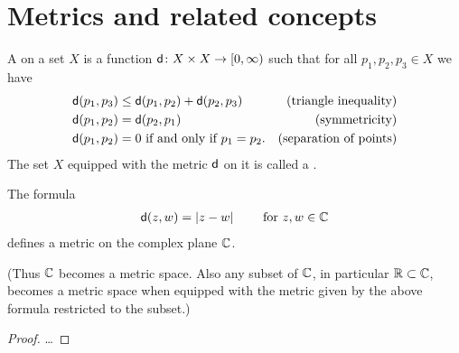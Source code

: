 \section{Metrics and related concepts}

\begin{definition}[Metric]
  \label{def:metric_space}
  A  on a set $X$ is a function
  $\mathsf{d} \colon X \times X \to [0,\infty)$ such that
  for all $p_1, p_2, p_3 \in X$ we have
  \begin{align*}
    \mathsf{d}(p_1, p_3) \le \; & \mathsf{d}(p_1,p_2) + \mathsf{d}(p_2,p_3)
            & \text{(triangle inequality)} \\
    \mathsf{d}(p_1, p_2) = \; & \mathsf{d}(p_2,p_1)
            & \text{(symmetricity)} \\
    \mathsf{d}(p_1, p_2) = \; & 0 \text{ if and only if } p_1 = p_2 .
            & \text{(separation of points)}
  \end{align*}
  The set $X$ equipped with the metric $\mathsf{d}$ on
  it is called a .
\end{definition}

\begin{lemma}
  \label{lem:metric_on_C}
  The formula
  \begin{align*}
    \mathsf{d}(z,w) = |z - w|
    \qquad \text{ for } z,w \in \mathbb{C}
  \end{align*}
  defines a metric on the complex plane $\mathbb{C}$.

  (Thus $\mathbb{C}$ becomes a metric space. Also any subset of $\mathbb{C}$,
  in particular $\mathbb{R} \subset \mathbb{C}$, becomes a metric space when equipped
  with the metric given by the above formula restricted to the subset.)
\end{lemma}
\begin{proof}
  \ldots
\end{proof}

